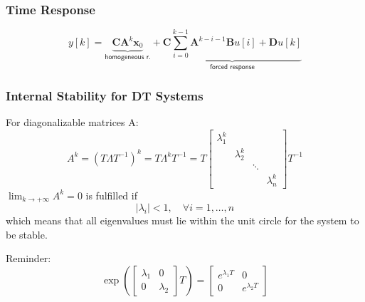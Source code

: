 \subsubsection{Time Response}
\noindent\begin{equation*}
    y[k]=\underbrace{\textbf{CA}^{k}\textbf{x}_0}_{\textsf{homogeneous r.}} + \underbrace{\textbf{C}\sum_{i=0}^{k-1}\textbf{A}^{k-i-1}\textbf{B} u[i]+\textbf{D} u[k]}_{\textsf{forced response}}
\end{equation*}


\subsubsection{Internal Stability for DT Systems}

For diagonalizable matrices A:\
\begin{equation*}
    A^k ={(T\Lambda T^{-1})}^k=T\Lambda^{k}T^{-1}=T
    \begin{bmatrix}
        \lambda_1^k &             &        &             \\
                    & \lambda_2^k &        &             \\
                    &             & \ddots &             \\
                    &             &        & \lambda_n^k
    \end{bmatrix}T^{-1}
\end{equation*}
$\lim_{k\to+\infty}A^k=0$ is fulfilled if
\begin{equation*}
    |\lambda_i| <1,\quad\forall i=1,\ldots,n
\end{equation*}
which means that all eigenvalues must lie within the unit circle for the system to be stable.

Reminder:
\begin{equation*}
    \exp\left(
    \begin{bmatrix}
        \lambda_1 & 0         \\
        0         & \lambda_2
    \end{bmatrix}
    T\right) =
    \begin{bmatrix}
        e^{\lambda_{1}T} & 0                \\
        0                & e^{\lambda_{2}T}
    \end{bmatrix}
\end{equation*}

